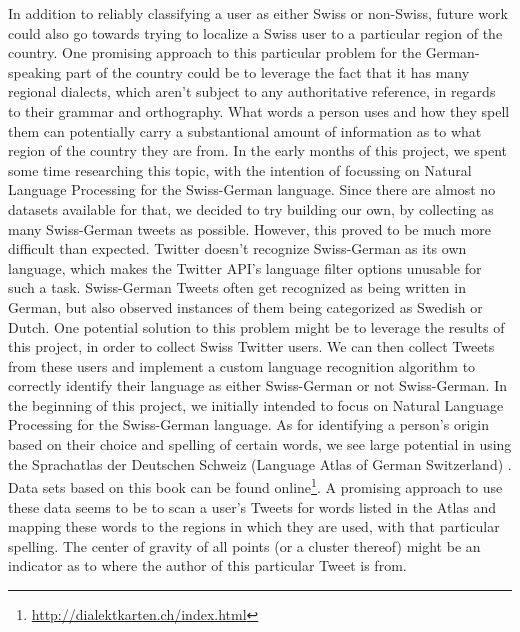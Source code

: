 \documentclass[10pt,a4paper]{article}
\begin{document}
In addition to reliably classifying a user as either Swiss or non-Swiss, future work could also go towards trying to localize a Swiss user to a particular region of the country. One promising approach to this particular problem for the German-speaking part of the country could be to leverage the fact that it has many regional dialects, which aren't subject to any authoritative reference, in regards to their grammar and orthography. What words a person uses and how they spell them can potentially carry a substantional amount of information as to what region of the country they are from. In the early months of this project, we spent some time researching this topic, with the intention of focussing on Natural Language Processing for the Swiss-German language. Since there are almost no datasets available for that, we decided to try building our own, by collecting as many Swiss-German tweets as possible. However, this proved to be much more difficult than expected. Twitter doesn't recognize Swiss-German as its own language, which makes the Twitter API's language filter options unusable for such a task. Swiss-German Tweets often get recognized as being written in German, but also observed instances of them being categorized as Swedish or Dutch. One potential solution to this problem might be to leverage the results of this project, in order to collect Swiss Twitter users. We can then collect Tweets from these users and implement a custom language recognition algorithm to correctly identify their language as either Swiss-German or not Swiss-German. In the beginning of this project, we initially intended to focus on Natural Language Processing for the Swiss-German language. As for identifying a person's origin based on their choice and spelling of certain words, we see large potential in using the Sprachatlas der Deutschen Schweiz (Language Atlas of German Switzerland) \cite{sprachatlas_der_deutschen_schweiz}. Data sets based on this book can be found online\footnote{\href{http://dialektkarten.ch/index.html}{http://dialektkarten.ch/index.html}}. A promising approach to use these data seems to be to scan a user's Tweets for words listed in the Atlas and mapping these words to the regions in which they are used, with that particular spelling. The center of gravity of all points (or a cluster thereof) might be an indicator as to where the author of this particular Tweet is from.
\end{document}
